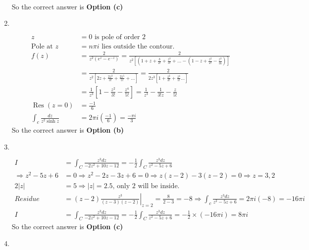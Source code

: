 \begin{enumerate}
\begin{answer}
\begin{align*}
		\end{align*}
		So the correct answer is \textbf{Option (c)}
	\end{answer}
		\item $\left. \right. $
	\begin{answer}
		\begin{align*}
		z&=0\text{ is pole of order 2}\\
		\text{Pole at }z&=n \pi i\text{ lies outside the contour.}\\
		f(z)&=\frac{2}{z^{2}\left(e^{z}-e^{-z}\right)}=\frac{2}{z^{2}\left[\left(1+z+\frac{3}{2 !}+\frac{z^{3}}{3 !}+\ldots-\left(1-z+\frac{z^{2}}{2 !}-\frac{z^{3}}{3 i}\right)\right]\right.}\\
		&=\frac{2}{z^{2}\left[2 z+\frac{2 z^{3}}{3 !}+\frac{2 z^{5}}{5 !}+\ldots\right]}=\frac{2}{2 z^{3}\left[1+\frac{z^{2}}{3 !}+\frac{z^{4}}{5 !} \ldots\right]}\\
		&=\frac{1}{z^{3}}\left[1-\frac{z^{2}}{3 !}-\frac{z^{4}}{5 !}\right]=\frac{1}{z^{3}}-\frac{1}{3 ! z}-\frac{z}{5 !}\\
		\operatorname{Res}(z=0)&=\frac{-1}{6}\\
		\int_{c} \frac{d z}{z^{2} \sinh z}&=2 \pi i\left(\frac{-1}{6}\right)=\frac{-\pi i}{3}
		\end{align*}
			So the correct answer is \textbf{Option (b)}
	\end{answer}
		\item $\left. \right. $
	\begin{answer}
		\begin{align*}
		I&=\int_{C} \frac{z^{3} d z}{-2 z^{2}+10 z-12}=-\frac{1}{2} \int_{C} \frac{z^{3} d z}{z^{2}-5 z+6}\\
		\Rightarrow z^{2}-5 z+6&=0 \Rightarrow z^{2}-2 z-3 z+6=0 \Rightarrow z(z-2)-3(z-2)=0 \Rightarrow z=3,2\\
		2|z|&=5 \Rightarrow|z|=2.5\text{, only 2 will be inside.}\\
		Residue &=\left.(z-2) \frac{z^{3}}{(z-3)(z-2)}\right|_{z=2}=\frac{8}{2-3}=-8 \Rightarrow \int_{c} \frac{z^{3} d z}{z^{2}-5 z+6}=2 \pi i(-8)=-16 \pi i\\
		I&=\int_{C} \frac{z^{3} d z}{-2 z^{2}+10 z-12}=-\frac{1}{2} \int_{C} \frac{z^{3} d z}{z^{2}-5 z+6}=-\frac{1}{2} \times(-16 \pi i)=8 \pi i
		\end{align*}
			So the correct answer is \textbf{Option (c)}
	\end{answer}
	\item $\left. \right. $
	\begin{answer}

\end{answer}
\end{enumerate}
